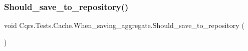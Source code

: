 \subsubsection{\texorpdfstring{Should\+\_\+save\+\_\+to\+\_\+repository()}{Should\_save\_to\_repository()}}
{\footnotesize\ttfamily void Cqrs.\+Tests.\+Cache.\+When\+\_\+saving\+\_\+aggregate.\+Should\+\_\+save\+\_\+to\+\_\+repository (\begin{DoxyParamCaption}{ }\end{DoxyParamCaption})}

